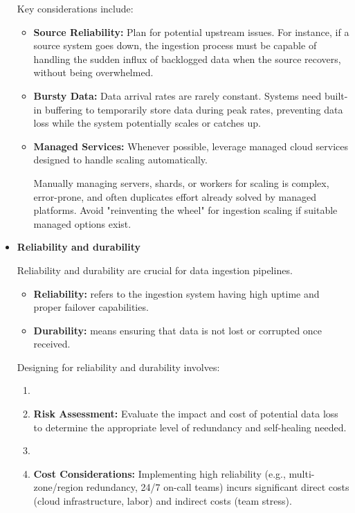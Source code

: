 \begin{itemize}
    Key considerations include:
    \begin{itemize}
        \item \textbf{Source Reliability:} Plan for potential
        upstream issues. For instance, if a source system goes down,
        the ingestion process must be capable of handling the
        sudden influx of backlogged data when the source recovers,
        without being overwhelmed.

        \item \textbf{Bursty Data:} Data arrival rates are rarely
        constant. Systems need built-in buffering to temporarily
        store data during peak rates, preventing data loss while
        the system potentially scales or catches up.

        \item \textbf{Managed Services:} Whenever possible, leverage
        managed cloud services designed to handle scaling
        automatically.
        
        Manually managing servers, shards, or workers for scaling is
        complex, error-prone, and often duplicates effort already
        solved by managed platforms. Avoid "reinventing the wheel"
        for ingestion scaling if suitable managed options exist.
    \end{itemize}

    
    \item \textbf{Reliability and durability}
    
    \noindent
    Reliability and durability are crucial for data ingestion
    pipelines.
    \begin{itemize}
        \item \textbf{Reliability:} refers to the ingestion system
        having high uptime and proper failover capabilities.
        \item \textbf{Durability:} means ensuring that data is not
        lost or corrupted once received.
    \end{itemize}

    Designing for reliability and durability involves:
    \begin{enumerate}
        \item \item \textbf{Risk Assessment:} Evaluate the impact
        and cost of potential data loss to determine the appropriate
        level of redundancy and self-healing needed.

        \item \item \textbf{Cost Considerations:}  Implementing high
        reliability (e.g., multi-zone/region redundancy, 24/7
        on-call teams) incurs significant direct costs
        (cloud infrastructure, labor) and indirect costs
        (team stress).


\end{enumerate}
\end{itemize}
